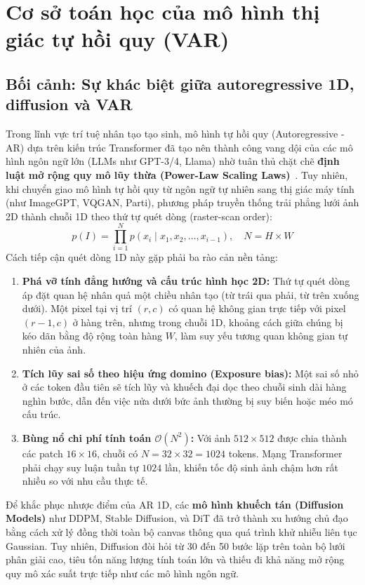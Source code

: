 \documentclass[10pt,twocolumn,letterpaper]{article}
\begin{document}
\section{Cơ sở toán học của mô hình thị giác tự hồi quy (VAR)}
\label{sec:var}

\subsection{Bối cảnh: Sự khác biệt giữa autoregressive 1D, diffusion và VAR}
Trong lĩnh vực trí tuệ nhân tạo tạo sinh, mô hình tự hồi quy (Autoregressive - AR) dựa trên kiến trúc Transformer đã tạo nên thành công vang dội của các mô hình ngôn ngữ lớn (LLMs như GPT-3/4, Llama) nhờ tuân thủ chặt chẽ \textbf{định luật mở rộng quy mô lũy thừa (Power-Law Scaling Laws)}~\cite{tian2024visual}. Tuy nhiên, khi chuyển giao mô hình tự hồi quy từ ngôn ngữ tự nhiên sang thị giác máy tính (như ImageGPT, VQGAN, Parti), phương pháp truyền thống trải phẳng lưới ảnh 2D thành chuỗi 1D theo thứ tự quét dòng (raster-scan order):
\begin{equation}
p(I) = \prod_{i=1}^{N} p(x_i \mid x_1, x_2, \dots, x_{i-1}), \quad N = H \times W
\end{equation}
Cách tiếp cận quét dòng 1D này gặp phải ba rào cản nền tảng:
\begin{enumerate}
    \item \textbf{Phá vỡ tính đẳng hướng và cấu trúc hình học 2D:} Thứ tự quét dòng áp đặt quan hệ nhân quả một chiều nhân tạo (từ trái qua phải, từ trên xuống dưới). Một pixel tại vị trí $(r, c)$ có quan hệ không gian trực tiếp với pixel $(r-1, c)$ ở hàng trên, nhưng trong chuỗi 1D, khoảng cách giữa chúng bị kéo dãn bằng độ rộng toàn hàng $W$, làm suy yếu tương quan không gian tự nhiên của ảnh.
    \item \textbf{Tích lũy sai số theo hiệu ứng domino (Exposure bias):} Một sai số nhỏ ở các token đầu tiên sẽ tích lũy và khuếch đại dọc theo chuỗi sinh dài hàng nghìn bước, dẫn đến việc nửa dưới bức ảnh thường bị suy biến hoặc méo mó cấu trúc.
    \item \textbf{Bùng nổ chi phí tính toán $\mathcal{O}(N^2)$:} Với ảnh $512 \times 512$ được chia thành các patch $16 \times 16$, chuỗi có $N = 32 \times 32 = 1024$ tokens. Mạng Transformer phải chạy suy luận tuần tự $1024$ lần, khiến tốc độ sinh ảnh chậm hơn rất nhiều so với nhu cầu thực tế.
\end{enumerate}

Để khắc phục nhược điểm của AR 1D, các \textbf{mô hình khuếch tán (Diffusion Models)} như DDPM, Stable Diffusion, và DiT đã trở thành xu hướng chủ đạo bằng cách xử lý đồng thời toàn bộ canvas thông qua quá trình khử nhiễu liên tục Gaussian. Tuy nhiên, Diffusion đòi hỏi từ 30 đến 50 bước lặp trên toàn bộ lưới phân giải cao, tiêu tốn năng lượng tính toán lớn và thiếu đi khả năng mở rộng quy mô xác suất trực tiếp như các mô hình ngôn ngữ.
\end{document}
